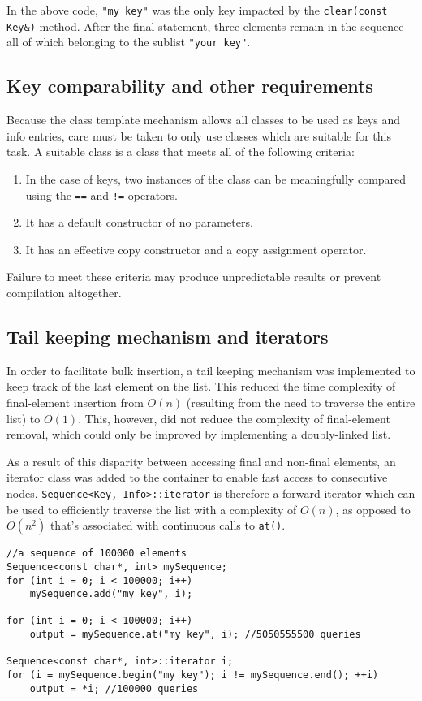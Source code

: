 ﻿\documentclass{article}
\begin{document}
In the above code, {\tt "my key"} was the only key impacted by the
{\tt clear(const Key\&)} method. After the final statement, three elements
remain in the sequence - all of which belonging to the sublist {\tt "your key"}.

\subsection{Key comparability and other requirements}

Because the class template mechanism allows all classes to be used as keys and
info entries, care must be taken to only use classes which are suitable for
this task. A suitable class is a class that meets all of the following criteria:

\begin{enumerate}
\item In the case of keys, two instances of the class can be meaningfully
compared using the {\tt ==} and {\tt !=} operators.
\item It has a default constructor of no parameters.
\item It has an effective copy constructor and a copy assignment operator.
\end{enumerate}

Failure to meet these criteria may produce unpredictable results or prevent
compilation altogether.

\subsection{Tail keeping mechanism and iterators}

In order to facilitate bulk insertion, a tail keeping mechanism was implemented
to keep track of the last element on the list. This reduced the time complexity
of final-element insertion from $O(n)$ (resulting from the need to traverse the
entire list) to $O(1)$. This, however, did not reduce the complexity of
final-element removal, which could only be improved by implementing a
doubly-linked list.

As a result of this disparity between accessing final and non-final elements,
an iterator class was added to the container to enable fast access to
consecutive nodes. {\tt Sequence<Key, Info>::iterator} is therefore a forward
iterator which can be used to efficiently traverse the list with a complexity of
$O(n)$, as opposed to $O(n^2)$ that's associated with continuous calls to
{\tt at()}.

\begin{verbatim}
//a sequence of 100000 elements
Sequence<const char*, int> mySequence;
for (int i = 0; i < 100000; i++)
    mySequence.add("my key", i);

for (int i = 0; i < 100000; i++)
    output = mySequence.at("my key", i); //5050555500 queries

Sequence<const char*, int>::iterator i;
for (i = mySequence.begin("my key"); i != mySequence.end(); ++i)
    output = *i; //100000 queries
\end{verbatim}
\end{document}
